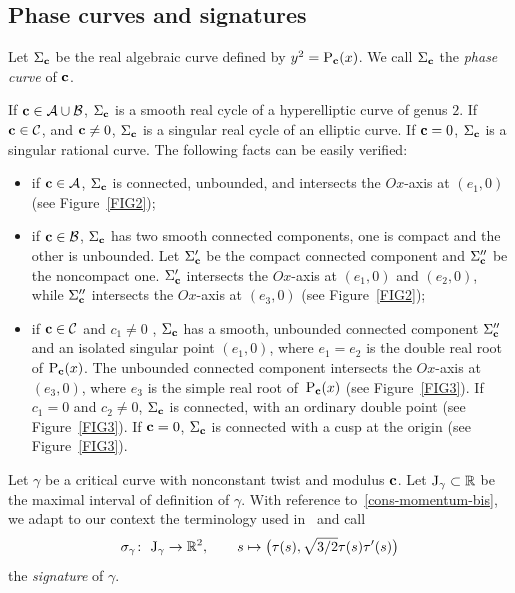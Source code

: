 \documentclass[10pt,a4paper]{amsart}
\numberwithin{equation}{section}
\def\R{\mathbb{R}}
\begin{document}
\subsection{Phase curves and signatures}%

\begin{Definition}
Let $\Sigma_{{\bf c}}$ be the {real} algebraic curve defined by $y^2={\rm P}_{\bf c}(x)$.
We call $\Sigma_{{\bf c}}$ the \emph{phase curve} of ${\bf c}$.
\end{Definition}

If ${\bf c}\in \mathcal A\cup \mathcal B$, $\Sigma_{{\bf c}}$ is a smooth real cycle of a hyperelliptic curve of genus $2$.
If ${\bf c}\in \mathcal C$, and ${\bf c}\neq 0$, $\Sigma_{{\bf c}}$ is a singular real cycle of an elliptic curve.
If ${\bf c}=0$, $\Sigma_{{\bf c}}$ is a singular rational curve.
{The following facts can be easily verified:}
\begin{itemize}\itemsep=0pt

\item if ${\bf c}\in {\mathcal A}$, $\Sigma_{{\bf c}}$ is connected, unbounded, and intersects the $Ox$-axis at $(e_1,0)$
(see Figure~\ref{FIG2});

\item if ${\bf c}\in {\mathcal B}$, $\Sigma_{{\bf c}}$ has two smooth connected components, one is compact and the other
is unbounded. Let $\Sigma'_{{\bf c}}$ be the compact connected component and $\Sigma''_{{\bf c}}$ be the noncompact one.
$\Sigma'_{{\bf c}}$ intersects the $Ox$-axis at $(e_1,0)$ and $(e_2,0)$, while $\Sigma''_{{\bf c}}$ intersects
the $Ox$-axis at $(e_3,0)$ (see Figure~\ref{FIG2});

\item if ${\bf c}\in {\mathcal C}$ and $c_1 \neq 0$ , $\Sigma_{{\bf c}}$ has a smooth, unbounded connected
component $\Sigma''_{{\bf c}}$ and an isolated singular point $(e_1,0)$, where $e_1=e_2$ is the double real root
of ${\rm P}_{\bf c}(x)$.
The unbounded connected component intersects the $Ox$-axis at $(e_3,0)$, where $e_3$ is the simple real root
of~${\rm P}_{\bf c}(x)$ (see Figure~\ref{FIG3}). If $c_1=0$ and $c_2\neq0$, $\Sigma_{{\bf c}}$ is connected, with
an ordinary double point (see Figure~\ref{FIG3}). If ${\bf c}=0$, $\Sigma_{{\bf c}}$ is connected with a cusp
at the origin (see Figure~\ref{FIG3}).
\end{itemize}

\begin{Definition}
Let $\gamma$ be a critical curve with nonconstant twist and modulus ${\bf c}$. Let ${\rm J}_{\gamma}\subset \R$ be
the maximal interval of definition of $\gamma$.
%
%
With reference to~\eqref{cons-momentum-bis}, we adapt to our context the terminology used in~\cite{COST,KRV,MNJMIV}
and call
\[
\sigma_{\gamma} \colon \ {\rm J}_{\gamma} \to \R^2, \qquad s\mapsto \big(\tau(s),\sqrt{3/2} \tau(s){\tau'}(s)\big)
\]
the \emph{signature} of $\gamma$.
\end{Definition}
\end{document}
